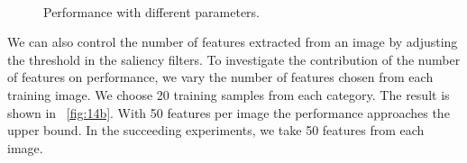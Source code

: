 \documentclass[twocolumn]{article}
\begin{document}
\begin{figure}[!t]
\centering
  \\
\caption{Performance with different parameters.}
\label{fig:14}
\end{figure}

We can also control the number of features extracted from an image by adjusting the threshold in the saliency filters. 
To investigate the contribution of the number of features on performance, we vary the number of features chosen from each training image.
We choose 20 training samples from each category.
The result is shown in \figurename~\ref{fig:14b}.
With 50 features per image the performance approaches the upper bound.
In the succeeding experiments, we take 50 features from each image.
\end{document}

